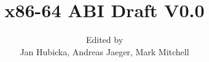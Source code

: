 \documentclass[12pt]{report}
\begin{document}
\author{Edited by\\
Jan Hubicka, Andreas Jaeger, Mark Mitchell}
\title{x86-64 ABI Draft V0.0}
\maketitle
\tableofcontents
\listoftables








\end{document}
